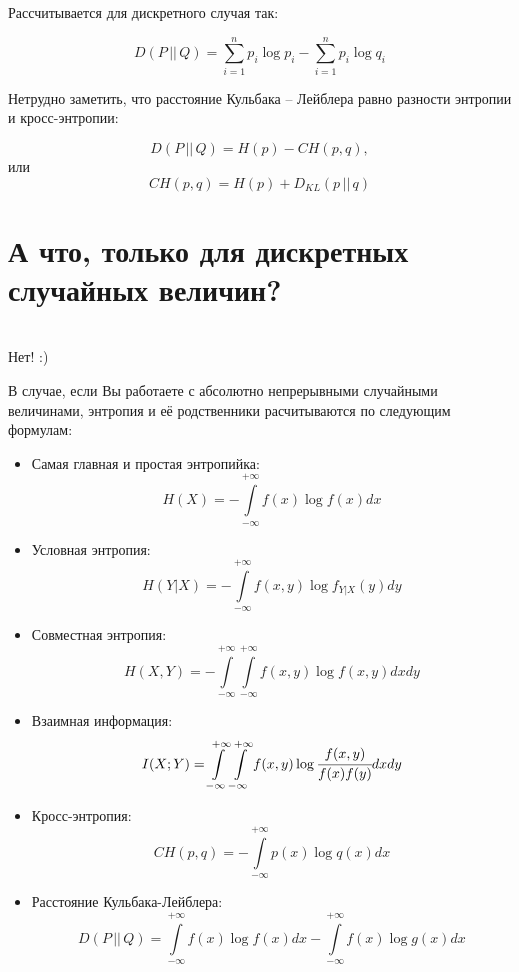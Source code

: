     Рассчитывается для дискретного случая так:

    \[D(P\, ||\, Q)=\sum\limits_{i=1}^n p_i\log p_i-\sum\limits_{i=1}^n p_i\log q_i\]

Нетрудно заметить, что расстояние Кульбака -- Лейблера равно разности энтропии и кросс-энтропии:

\[D(P\, ||\, Q)=H(p)-CH(p,q),\]
или
\[CH(p, q)=H(p)+D_{KL}(p\, || \, q)\]

\section*{А что, только для дискретных случайных величин?}~\
\\

Нет! :)

В случае, если Вы работаете с абсолютно непрерывными случайными величинами, энтропия и её родственники расчитываются по следующим формулам:

\begin{itemize}
    \item Самая главная и простая энтропийка:
    \[H(X)=-\int\limits_{-\infty}^{+\infty} f(x)\log f(x)dx \]
    \item Условная энтропия:
    \[H(Y|X)=-\int\limits_{-\infty}^{+\infty} f(x, y)\log f_{Y|X}(y)dy \]
    \item Совместная энтропия:
    \[H(X, Y)=-\int\limits_{-\infty}^{+\infty} \int\limits_{-\infty}^{+\infty} f(x, y)\log f(x, y)dxdy \]
    \item Взаимная информация:
    \[I(X; Y)=\int\limits_{-\infty}^{+\infty} \int\limits_{-\infty}^{+\infty} f(x, y) \log \cfrac{f(x, y)}{f(x)f(y)}dxdy \]
    \item Кросс-энтропия:
    \[CH(p, q)=-\int\limits_{-\infty}^{+\infty}p(x)\log q(x) dx \]
    \item Расстояние Кульбака-Лейблера:
    \[D(P\, ||\, Q)=\int\limits_{-\infty}^{+\infty} f(x)\log f(x)dx -\int\limits_{-\infty}^{+\infty} f(x)\log g(x)dx  \]
\end{itemize}
